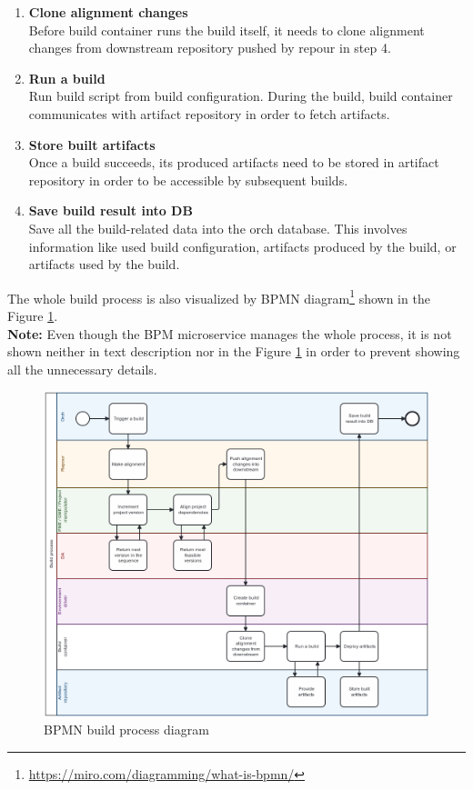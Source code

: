 \documentclass[../main.tex]{subfiles}
\begin{document}
\begin{enumerate}
    \item \textbf{Clone alignment changes}\\
    Before build container runs the build itself, it needs to clone alignment changes from downstream repository pushed by repour in step 4.

    \item \textbf{Run a build}\\
    Run build script from build configuration. During the build, build container communicates with artifact repository in order to fetch artifacts.

    \item \textbf{Store built artifacts}\\
    Once a build succeeds, its produced artifacts need to be stored in artifact repository in order to be accessible by subsequent builds.

    \item \textbf{Save build result into DB}\\
    Save all the build-related data into the orch database. This involves information like used build configuration, artifacts produced by the build, or artifacts used by the build.
    
\end{enumerate}

The whole build process is also visualized by BPMN diagram\footnote{\url{https://miro.com/diagramming/what-is-bpmn/}} shown in the Figure \ref{fig:build-process-bpmn}.\\
\textbf{Note:} Even though the BPM microservice manages the whole process, it is not shown neither in text description nor in the Figure \ref{fig:build-process-bpmn} in order to prevent showing all the unnecessary details.

\begin{figure}
  \begin{center}
    \includegraphics[width=\textwidth]{images/build-process-bpmn.png}
  \end{center}
  \caption{BPMN build process diagram}
  \label{fig:build-process-bpmn}
\end{figure}
\end{document}
